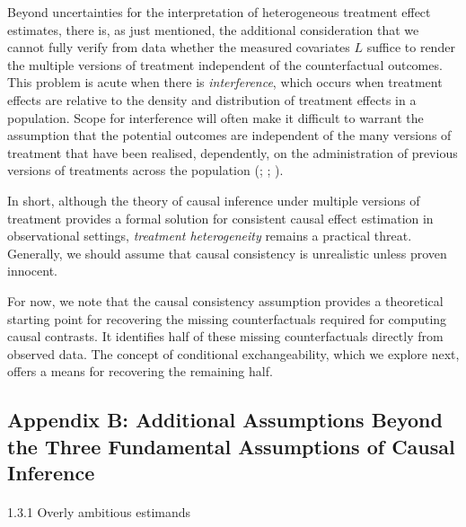\documentclass[
  singlecolumn]{article}
\makeatletter
\let\oldparagraph\paragraph
\renewcommand{\paragraph}{
    \@ifstar
      \xxxParagraphStar
      \xxxParagraphNoStar
  }
\newcommand{\xxxParagraphStar}[1]{\oldparagraph*{#1}\mbox{}}
\newcommand{\xxxParagraphNoStar}[1]{\oldparagraph{#1}\mbox{}}
\makeatother
\begin{document}
Beyond uncertainties for the interpretation of heterogeneous treatment
effect estimates, there is, as just mentioned, the additional
consideration that we cannot fully verify from data whether the measured
covariates \(L\) suffice to render the multiple versions of treatment
independent of the counterfactual outcomes. This problem is acute when
there is \emph{interference}, which occurs when treatment effects are
relative to the density and distribution of treatment effects in a
population. Scope for interference will often make it difficult to
warrant the assumption that the potential outcomes are independent of
the many versions of treatment that have been realised, dependently, on
the administration of previous versions of treatments across the
population (;
;
).

In short, although the theory of causal inference under multiple
versions of treatment provides a formal solution for consistent causal
effect estimation in observational settings, \emph{treatment
heterogeneity} remains a practical threat. Generally, we should assume
that causal consistency is unrealistic unless proven innocent.

For now, we note that the causal consistency assumption provides a
theoretical starting point for recovering the missing counterfactuals
required for computing causal contrasts. It identifies half of these
missing counterfactuals directly from observed data. The concept of
conditional exchangeability, which we explore next, offers a means for
recovering the remaining half.

\newpage{}

\subsection{Appendix B: Additional Assumptions Beyond the Three
Fundamental Assumptions of Causal
Inference}\label{appendix-b-additional-assumptions-beyond-the-three-fundamental-assumptions-of-causal-inference}

\paragraph{1.3.1 Overly ambitious
estimands}\label{overly-ambitious-estimands}
\end{document}
